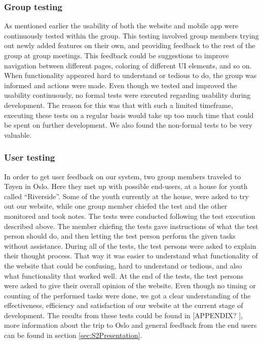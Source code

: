 \subsubsection{Group testing}
As mentioned earlier the usability of both the website and mobile app were continuously tested within the group. This testing involved group members trying out newly added features on their own, and providing feedback to the rest of the group at group meetings. This feedback could be suggestions to improve navigation between different pages, coloring of different UI elements, and so on. When functionality appeared hard to understand or tedious to do, the group was informed and actions were made. Even though we tested and improved the usability continuously, no formal tests were executed regarding usability during development. The reason for this was that with such a limited timeframe, executing these tests on a regular basis would take up too much time that could be spent on further development. We also found the non-formal tests to be very valuable.

\subsubsection{User testing}
In order to get user feedback on our system, two group members traveled to Tøyen in Oslo. Here they met up with possible end-users, at a house for youth called “Riverside”. Some of the youth currently at the house, were asked to try out our website, while one group member chiefed the test and the other monitored and took notes. The tests were conducted following the test execution described above. The member chiefing the tests gave instructions of what the test person should do, and then letting the test person perform the given tasks without assistance. During all of the tests, the test persons were asked to explain their thought process. That way it was easier to understand what functionality of the website that could be confusing, hard to understand or tedious, and also what functionality that worked well. At the end of the tests, the test persons were asked to give their overall opinion of the website. Even though no timing or counting of the performed tasks were done, we got a clear understanding of the effectiveness, efficiency and satisfaction of our website at the current stage of development. The results from these tests could be found in [APPENDIX? ], more information about the trip to Oslo and general feedback from the end users can be found in section \ref{sec:S2Presentation}.